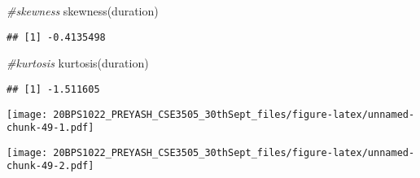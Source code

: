 \documentclass[
]{article}
\newenvironment{Shaded}{\begin{snugshade}}{\end{snugshade}}
\newcommand{\AttributeTok}[1]{\textcolor[rgb]{0.77,0.63,0.00}{#1}}
\newcommand{\CommentTok}[1]{\textcolor[rgb]{0.56,0.35,0.01}{\textit{#1}}}
\newcommand{\FunctionTok}[1]{\textcolor[rgb]{0.00,0.00,0.00}{#1}}
\newcommand{\NormalTok}[1]{#1}
\newcommand{\OtherTok}[1]{\textcolor[rgb]{0.56,0.35,0.01}{#1}}
\newcommand{\SpecialCharTok}[1]{\textcolor[rgb]{0.00,0.00,0.00}{#1}}
\newcommand{\StringTok}[1]{\textcolor[rgb]{0.31,0.60,0.02}{#1}}
\begin{document}
\begin{Shaded}
\begin{Highlighting}[]
\CommentTok{\#skewness}
\FunctionTok{skewness}\NormalTok{(duration)}
\end{Highlighting}
\end{Shaded}

\begin{verbatim}
## [1] -0.4135498
\end{verbatim}

\begin{Shaded}
\begin{Highlighting}[]
\CommentTok{\#kurtosis}
\FunctionTok{kurtosis}\NormalTok{(duration)}
\end{Highlighting}
\end{Shaded}

\begin{verbatim}
## [1] -1.511605
\end{verbatim}

\begin{Shaded}
\end{Shaded}

\texttt{[image: 20BPS1022\_PREYASH\_CSE3505\_30thSept\_files/figure-latex/unnamed-chunk-49-1.pdf]}

\begin{Shaded}
\end{Shaded}

\texttt{[image: 20BPS1022\_PREYASH\_CSE3505\_30thSept\_files/figure-latex/unnamed-chunk-49-2.pdf]}

\begin{Shaded}
\end{Shaded}
\end{document}
